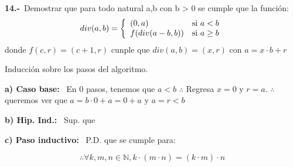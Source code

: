 \textbf{14.-}\ Demostrar que para todo natural a,b con b > 0 se cumple que la función:
\begingroup
\centering
\begin{equation}
    div(a,b) = \left\lbrace
    \begin{array}{ll}
     (0,a) & \textup{si } a<b\\
     f(div(a-b,b)) & \textup{si } a\geq b
    \end{array}
    \right.
\end{equation}
donde $f(c,r) = (c+1,r)$ cunple que $div(a,b)=(x,r)$ con $a=x\cdot b+r$

\endgroup

\vspace*{1em}
Inducción sobre los pasos del algoritmo.

\textbf{a) Caso base: }\ En $0$ pasos, tenemos que $a<b$
$\therefore$ Regresa $x=0$ y $r=a$. $\therefore$ queremos ver que  $a=b\cdot 0 + a = 0+a$ y $a = r < b$


\textbf{b) Hip. Ind.: }\ Sup. que 


\textbf{c) Paso inductivo: }\ P.D. que se cumple para:

$$\therefore \forall k,m,n\in \mathbb{N}, k\cdot(m\cdot n)=(k\cdot m)\cdot n$$


